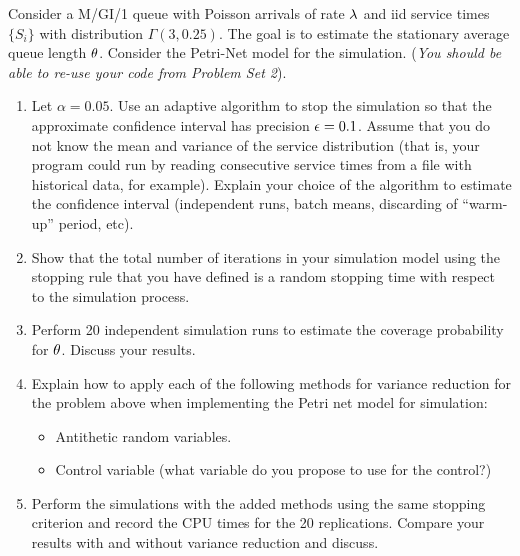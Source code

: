\documentclass[12pt]{article}
\begin{document}


\begin{problem}  Consider a M/GI/1 queue with Poisson arrivals
    of rate ${\lambda}$ and iid service times $\{S_i\}$ with  distribution
    $\Gamma(3,0.25)$. The goal is to estimate the stationary average
    queue length ${\theta}$. Consider the Petri-Net model for the simulation.
    ({\it You should be able to re-use your code from Problem Set 2}). 

\begin{enumerate}
\item  Let $\alpha=0.05$. Use an adaptive algorithm to stop the
    simulation so that the approximate confidence interval has precision
    ${\epsilon} = 0.1$. Assume that you do not know the mean and variance of
    the service distribution (that is, your program could run by reading
    consecutive service times from a file with historical data, for
    example). Explain your choice of the algorithm to estimate the
    confidence interval (independent runs, batch means, discarding of
    ``warm-up'' period, etc). 
\item Show that the total number of iterations in your simulation model
    using the stopping rule that you have defined is a random stopping
    time with respect to the simulation process. 
\item Perform 20 independent simulation runs to estimate the coverage
    probability for ${\theta}$. Discuss your results.
\item Explain how to apply each of the following methods for variance
    reduction for the problem above when implementing the Petri net
    model for simulation:
\begin{itemize}
\item Antithetic random variables.
\item Control variable (what variable do you propose to use for the control?)
\end{itemize}
\item Perform the simulations with the added methods using the same
    stopping criterion and record the CPU times for the 20 replications.
    Compare your results with and without variance reduction and
    discuss. 
\end{enumerate}
\end{problem}
\end{document}

